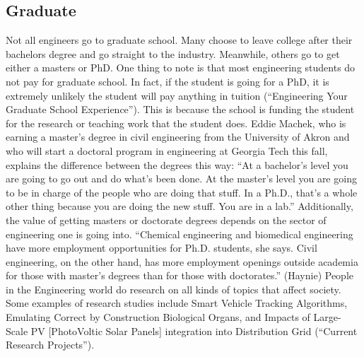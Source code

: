 \begin{multicols}{2}
    \subsection{Graduate}
        Not all engineers go to graduate school. Many choose to leave college after their bachelors degree and go straight to the industry. Meanwhile, others go to get either a masters or PhD. One thing to note is that most engineering students do not pay for graduate school. In fact, if the student is going for a PhD, it is extremely unlikely the student will pay anything in tuition (“Engineering Your Graduate School Experience”). This is because the school is funding the student for the research or teaching work that the student does. Eddie Machek, who is earning a master's degree in civil engineering from the University of Akron and who will start a doctoral program in engineering at Georgia Tech this fall, explains the difference between the degrees this way: “At a bachelor's level you are going to go out and do what's been done. At the master's level you are going to be in charge of the people who are doing that stuff. In a Ph.D., that's a whole other thing because you are doing the new stuff. You are in a lab.” Additionally, the value of getting masters or doctorate degrees depends on the sector of engineering one is going into. “Chemical engineering and biomedical engineering have more employment opportunities for Ph.D. students, she says. Civil engineering, on the other hand, has more employment openings outside academia for those with master’s degrees than for those with doctorates.”  (Haynie) 
        People in the Engineering world do research on all kinds of topics that affect society. Some examples of research studies include Smart Vehicle Tracking Algorithms, Emulating Correct by Construction Biological Organs, and Impacts of Large-Scale PV [PhotoVoltic Solar Panels] integration into Distribution Grid (“Current Research Projects”). 

\end{multicols}

